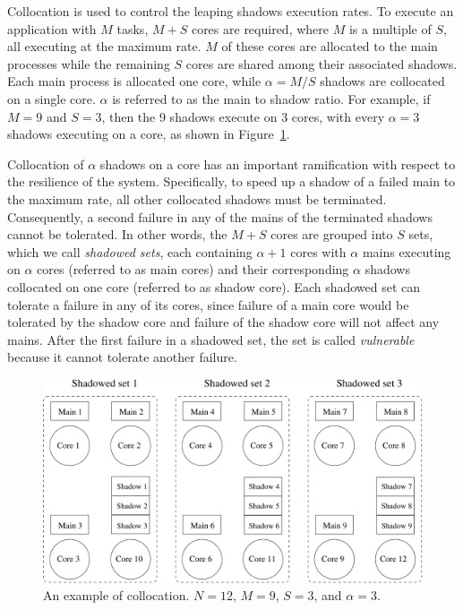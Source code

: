 Collocation is used to control the leaping shadows execution rates. To execute an application with $M$ tasks, $M+S$ cores are required, where $M$ is a multiple of $S$, all executing at the maximum rate. $M$ of these cores are allocated to the main processes while the remaining $S$ cores are shared among their associated shadows. Each main process is allocated one core, while $\alpha=M/S$ shadows are collocated on a single core. $\alpha$ is referred to as the main to shadow ratio. For example, if $M=9$ and $S=3$, then the 9 shadows execute on 3 cores, with every $\alpha=3$ shadows executing on a core, as shown in Figure~\ref{fig:sc_mapping}.
  
Collocation of $\alpha$ shadows on a core has an important ramification with respect to the resilience of the system. Specifically, to speed up a shadow 
of a failed main to the maximum rate, all other collocated shadows must be terminated. Consequently, a second failure in any of the mains of the terminated shadows cannot be tolerated. In other words, the $M+S$ cores are grouped into $S$ sets, which we call \emph{shadowed sets}, each containing $\alpha+1$ cores with $\alpha$ mains executing on $\alpha$ cores (referred to as main cores) and their corresponding $\alpha$ shadows collocated on one core (referred to as shadow core). Each shadowed set can tolerate a failure in any of its cores, since failure of a main core would be tolerated by the shadow core and failure of the shadow core will not affect any mains. After the first failure in a shadowed set, the set is called \emph{vulnerable} because it cannot tolerate another failure. %

\begin{figure}[!t]
  \begin{center}
    \includegraphics[width=\columnwidth]{Figures/sc_mapping.pdf}
  \end{center}
  \caption{An example of collocation. $N=12$, $M=9$, $S=3$, and $\alpha=3$.}
  \label{fig:sc_mapping}
\end{figure}






